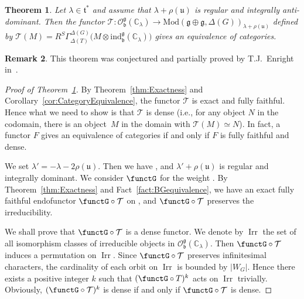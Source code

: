 \documentclass[pdftex]{sigma}
\numberwithin{equation}{section}
\newtheorem{Theorem}{Theorem}[section]
\theoremstyle{definition}
\newtheorem{Remark}[Theorem]{Remark}
\newcommand{\BasicRing}[1]{\mathbb{#1}}
\newcommand{\CC}{\BasicRing{C}}
\newcommand{\Mod}{\mathrm{Mod}}
\newcommand{\lieC}[1]{\mathfrak{#1}}
\newcommand{\lie}[1]{\mathfrak{#1}}
\newcommand{\ind}[2]{\mathrm{ind}^{\lieC{#1}}_{\lieC{#2}}}
\newcommand{\BGGcat}[2]{\mathcal{O}_{\lie{#2}}^{\lie{#1}}}
\newcommand{\zuck}[2]{\Gamma^{#1}_{#2}}
\newcommand{\Dzuck}[3]{R^{#3}\zuck{#1}{#2}}
\newcommand{\rhog}[1]{\rho(#1)}
\DeclareMathOperator{\Irr}{\mathrm{Irr}}
\begin{document}
\begin{Theorem}\label{thm:CategoryEquivalence}
	Let $\lambda \in \lie{t}^*$ and assume that $\lambda + \rhog{\lie{u}}$ is regular and integrally anti-dominant.
	Then the functor $\mathcal{T}\colon \BGGcat{g}{b}(\CC_{\lambda}) \rightarrow \Mod(\lie{g\oplus g}, \Delta(G))_{\lambda+\rhog{\lie{u}}}$
	defined by $\mathcal{T}(M) = \Dzuck{\Delta(G)}{\Delta(T)}{S}\bigl(M \otimes \ind{g}{b}(\CC_{\lambda})\bigr)$ gives an equivalence of categories.
\end{Theorem}

\begin{Remark}
	This theorem was conjectured and partially proved by T.J.~Enright in~\cite{En81_lecture}.
\end{Remark}

\begin{proof}[Proof of Theorem~\ref{thm:CategoryEquivalence}]
	By Theorem~\ref{thm:Exactness} and Corollary~\ref{cor:CategoryEquivalence}, the functor $\mathcal{T}$ is exact and fully faithful.
	Hence what we need to show is that $\mathcal{T}$ is dense (i.e., for any object $N$ in the codomain,
	there is an object~$M$ in the domain with $\mathcal{T}(M) \simeq N$).
	In fact, a functor $F$ gives an equivalence of categories if and only if $F$ is fully faithful and dense.

	We set $\lambda'=-\lambda-2\rhog{\lie{u}}$.
	Then we have \smash{$\BGGcat{g}{b}(\CC_{-\lambda'})=\BGGcat{g}{b}(\CC_{\lambda})$},
	and $\lambda' + \rhog{\lie{u}}$ is regular and integrally dominant.
	We consider $\functG$ for the weight .
	By Theorem~\ref{thm:Exactness} and Fact~\ref{fact:BGequivalence},
	we have an exact fully faithful endofunctor $\functG\circ \mathcal{T}$ on \smash{$\BGGcat{g}{b}(\CC_\lambda)$},
	and $\functG\circ \mathcal{T}$ preserves the irreducibility.

	We shall prove that $\functG\circ \mathcal{T}$ is a dense functor.
	We denote by $\Irr$ the set of all isomorphism classes of irreducible objects in $\BGGcat{g}{b}(\CC_\lambda)$.
	Then $\functG \circ \mathcal{T}$ induces a permutation on $\Irr$.
	Since $\functG\circ \mathcal{T}$ preserves infinitesimal characters,
	the cardinality of each orbit on $\Irr$ is bounded by $|W_G|$.
	Hence there exists a positive integer $k$ such that $(\functG\circ T)^k$ acts on $\Irr$ trivially.
	Obviously, $(\functG\circ \mathcal{T})^k$ is dense if and only if $\functG\circ \mathcal{T}$ is dense.


\end{proof}
\end{document}
